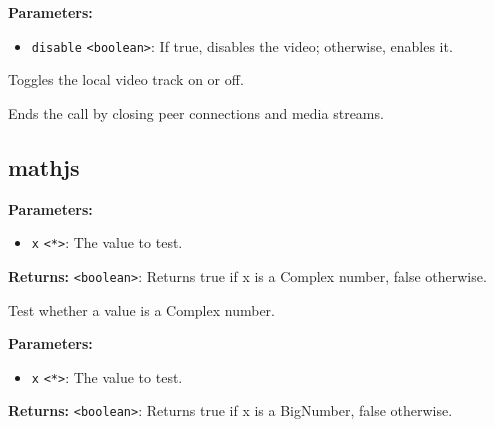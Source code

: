 \documentclass[12pt,a4paper]{article}
\begin{document}
\vspace{5mm}
\noindent {}


\noindent \textbf{Parameters:}
\begin{itemize}
  \item \texttt{disable} \texttt{<boolean>}: If true, disables the video; otherwise, enables it.
\end{itemize}

\noindent Toggles the local video track on or off.

\vspace{5mm}
\noindent {}


\noindent Ends the call by closing peer connections and media streams.


\subsection{mathjs}
\vspace{5mm}
\noindent {}


\noindent \textbf{Parameters:}
\begin{itemize}
  \item \texttt{x} \texttt{<*>}: The value to test.
\end{itemize}

\noindent \textbf{Returns:} \texttt{<boolean>}: Returns true if \textasciigrave{}x\textasciigrave{} is a Complex number, false otherwise.

\noindent Test whether a value is a Complex number.

\vspace{5mm}
\noindent {}


\noindent \textbf{Parameters:}
\begin{itemize}
  \item \texttt{x} \texttt{<*>}: The value to test.
\end{itemize}

\noindent \textbf{Returns:} \texttt{<boolean>}: Returns true if \textasciigrave{}x\textasciigrave{} is a BigNumber, false otherwise.
\end{document}

